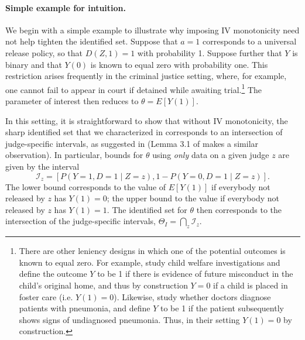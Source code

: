 \documentclass[12pt]{article}%
\theoremstyle{definition}
\newcommand\1{\operatorname{I}\indicatorfence}
\begin{document}
\paragraph{Simple example for intuition.} We begin with a simple example to
illustrate why imposing IV monotonicity need not help tighten the identified
set. Suppose that $a=1$ corresponds to a universal release policy, so that
$D(Z,1)=1$ with probability 1. Suppose further that $Y$ is binary and that
$Y(0)$ is known to equal zero with probability one. This restriction arises
frequently in the criminal justice setting, where, for example, one cannot fail
to appear in court if detained while awaiting trial.\footnote{There are other
  leniency designs in which one of the potential outcomes is known to equal
  zero. For example, \textcite{baron_discrimination_2024} study child welfare
  investigations and define the outcome $Y$ to be 1 if there is evidence of
  future misconduct in the child's original home, and thus by construction $Y=0$
  if a child is placed in foster care (i.e. $Y(1)=0$). Likewise,
  \textcite{cgy22} study whether doctors diagnose patients with pneumonia, and
  define $Y$ to be 1 if the patient subsequently shows signs of undiagnosed
  pneumonia. Thus, in their setting $Y(1)=0$ by construction.} The parameter of
interest then reduces to $\theta = E[Y(1)]$.

In this setting, it is straightforward to show that without IV monotonicity, the sharp identified set that we characterized in  corresponds to an intersection of judge-specific intervals, as suggested in \textcite{manski_nonparametric_1990} (Lemma 3.1 of \textcite{bai_identifying_2024} makes a similar observation). In particular, bounds
for $\theta$ using \emph{only} data on a given judge $z$ are given by the
interval
\begin{equation}\label{eq:judge_specific_I}
\mathcal{I}_z = [P(Y=1, D=1 \mid Z=z), 1-P(Y=0, D=1 \mid Z=z)].
\end{equation}
%
%
The lower bound corresponds to the value of $E[Y(1)]$ if everybody not released
by $z$ has $Y(1)=0$; the upper bound to the value if everybody not released by
$z$ has $Y(1)=1$. The identified set for $\theta$ then corresponds to the
intersection of the judge-specific intervals,
$\Theta_I = \bigcap_z \mathcal{I}_z$.
\end{document}
